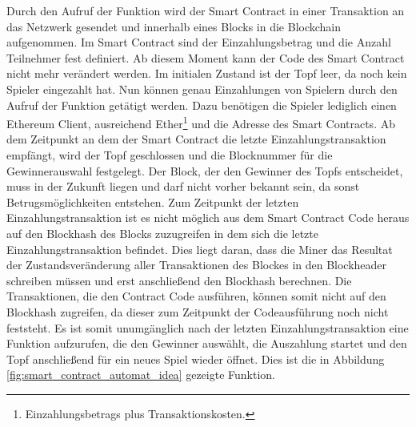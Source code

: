 Durch den Aufruf der  Funktion wird der Smart Contract in einer Transaktion an das Netzwerk gesendet und innerhalb eines Blocks in die Blockchain aufgenommen. Im Smart Contract sind der Einzahlungsbetrag und die Anzahl Teilnehmer  fest definiert. Ab diesem Moment kann der Code des Smart Contract nicht mehr verändert werden. Im initialen Zustand ist der Topf leer, da noch kein Spieler eingezahlt hat. Nun können genau  Einzahlungen von Spielern durch den Aufruf der  Funktion getätigt werden. Dazu benötigen die Spieler lediglich einen Ethereum Client, ausreichend Ether\footnote{Einzahlungsbetrags plus Transaktionskosten.} und die Adresse des Smart Contracts. Ab dem Zeitpunkt an dem der Smart Contract die letzte Einzahlungstransaktion empfängt, wird der Topf geschlossen und die Blocknummer für die Gewinnerauswahl festgelegt. Der Block, der den Gewinner des Topfs entscheidet, muss in der Zukunft liegen und darf nicht vorher bekannt sein, da sonst Betrugsmöglichkeiten entstehen. Zum Zeitpunkt der letzten Einzahlungstransaktion ist es nicht möglich aus dem Smart Contract Code heraus auf den Blockhash des Blocks zuzugreifen in dem sich die letzte Einzahlungstransaktion befindet. Dies liegt daran, dass die Miner das Resultat der Zustandsveränderung aller Transaktionen des Blockes in den Blockheader schreiben müssen und erst anschließend den Blockhash berechnen. Die Transaktionen, die den Contract Code ausführen, können somit nicht auf den Blockhash zugreifen, da dieser zum Zeitpunkt der Codeausführung noch nicht feststeht. Es ist somit unumgänglich nach der letzten Einzahlungstransaktion eine Funktion aufzurufen, die den Gewinner auswählt, die Auszahlung startet und den Topf anschließend für ein neues Spiel wieder öffnet. Dies ist die in Abbildung \ref{fig:smart_contract_automat_idea} gezeigte  Funktion.